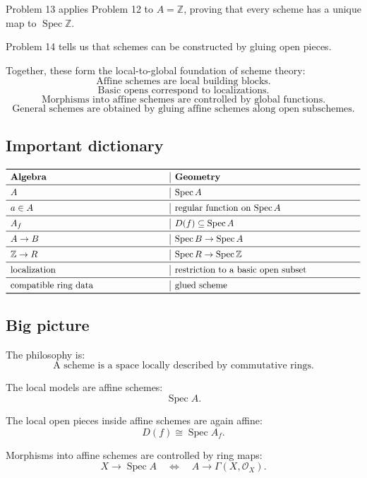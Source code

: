 \documentclass[12pt,a4paper]{article}
\newcommand{\ZZ}{\mathbb Z}
\newcommand{\OO}{\mathcal{O}}
\newcommand{\Spec}{\operatorname{Spec}}
\theoremstyle{notespace}
\begin{document}
Problem 13 applies Problem 12 to \(A=\ZZ\), proving that every scheme has a unique map to \(\Spec\ZZ\).

Problem 14 tells us that schemes can be constructed by gluing open pieces.

Together, these form the local-to-global foundation of scheme theory:
\[
\boxed{
	\text{Affine schemes are local building blocks.}
}
\]
\[
\boxed{
	\text{Basic opens correspond to localizations.}
}
\]
\[
\boxed{
	\text{Morphisms into affine schemes are controlled by global functions.}
}
\]
\[
\boxed{
	\text{General schemes are obtained by gluing affine schemes along open subschemes.}
}
\]

\subsection{Important dictionary}

\[
\begin{array}{>{\raggedright\arraybackslash}p{6cm}
		|>{\raggedright\arraybackslash}p{7cm}}
	\toprule
	\textbf{Algebra} & \textbf{Geometry} \\
	\midrule
	\(A\) & \(\Spec A\) \\
	\midrule
	\(a\in A\) & regular function on \(\Spec A\) \\
	\midrule
	\(A_f\) & \(D(f)\subseteq\Spec A\) \\
	\midrule
	\(A\to B\) & \(\Spec B\to\Spec A\) \\
	\midrule
	\(\ZZ\to R\) & \(\Spec R\to\Spec\ZZ\) \\
	\midrule
	localization & restriction to a basic open subset \\
	\midrule
	compatible ring data & glued scheme \\
	\bottomrule
\end{array}
\]

\subsection{Big picture}

The philosophy is:
\[
\boxed{
	\text{A scheme is a space locally described by commutative rings.}
}
\]

The local models are affine schemes:
\[
\Spec A.
\]

The local open pieces inside affine schemes are again affine:
\[
D(f)\cong\Spec A_f.
\]

Morphisms into affine schemes are controlled by ring maps:
\[
X\to\Spec A
\quad\Longleftrightarrow\quad
A\to\Gamma(X,\OO_X).
\]
\end{document}
